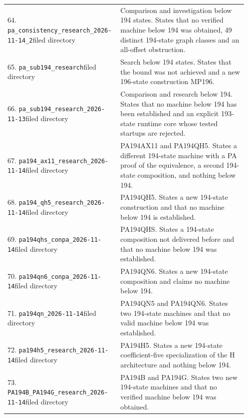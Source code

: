 \begin{longtable}{@{}p{0.43\linewidth}p{0.52\linewidth}@{}}
64. \nolinkurl{pa_consistency_research_2026-11-14_2}\newline filed directory&Comparison and investigation below 194 states. States that no verified machine below 194 was obtained, 49 distinct 194-state graph classes and an all-offset obstruction.\\[5pt]
65. \nolinkurl{pa_sub194_research}\newline filed directory&Search below 194 states. States that the bound was not achieved and a new 196-state construction MP196.\\[5pt]
66. \nolinkurl{pa_sub194_research_2026-11-13}\newline filed directory&Comparison and research below 194. States that no machine below 194 has been established and an explicit 193-state runtime core whose tested startups are rejected.\\[5pt]
67. \nolinkurl{pa194_ax11_research_2026-11-14}\newline filed directory&PA194AX11 and PA194QH5. States a different 194-state machine with a PA proof of the equivalence, a second 194-state composition, and nothing below 194.\\[5pt]
68. \nolinkurl{pa194_qh5_research_2026-11-14}\newline filed directory&PA194QH5. States a new 194-state construction and that no machine below 194 is established.\\[5pt]
69. \nolinkurl{pa194qhs_conpa_2026-11-14}\newline filed directory&PA194QHS. States a 194-state composition not delivered before and that no machine below 194 was established.\\[5pt]
70. \nolinkurl{pa194qn6_conpa_2026-11-14}\newline filed directory&PA194QN6. States a new 194-state composition and claims no machine below 194.\\[5pt]
71. \nolinkurl{pa194qn_2026-11-14}\newline filed directory&PA194QN5 and PA194QN6. States two 194-state machines and that no valid machine below 194 was established.\\[5pt]
72. \nolinkurl{pa194h5_research_2026-11-14}\newline filed directory&PA194H5. States a new 194-state coefficient-five specialization of the H architecture and nothing below 194.\\[5pt]
73. \nolinkurl{PA194B_PA194G_research_2026-11-14}\newline filed directory&PA194B and PA194G. States two new 194-state machines and that no verified machine below 194 was obtained.\\[5pt]

\end{longtable}
